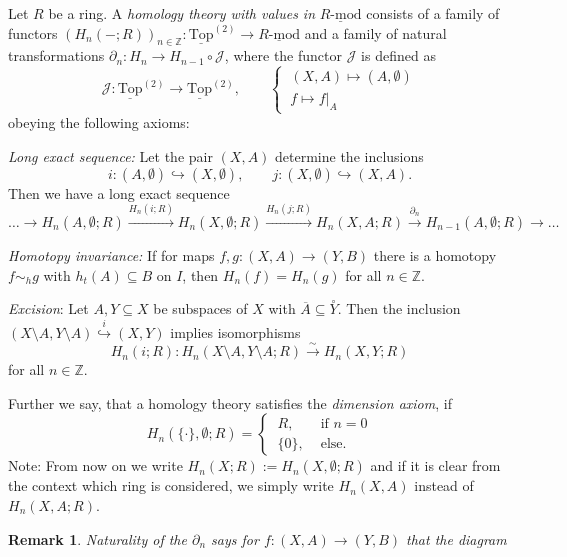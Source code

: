 \documentclass[11pt]{book}
\numberwithin{dummy}{section}
\newtheorem{remark}[theorem]{Remark}
\theoremstyle{nonumberbreak}
\newenvironment{defin}[1][]{\ifthenelse{\equal{#1}{}}{\definition}{\definition[#1]}\rm}{\enddefinition}
\newcommand{\Rmod}{\underline{R\textrm{-}\mathrm{mod}}}
\newcommand{\toptwo}{\underline{\mathrm{Top}}^{(2)}}
\newcommand{\la}{\longrightarrow}
\newcommand{\Z}{\mathbb{Z}}
\begin{document}
\begin{spacing}{1.4}
\begin{defin}
Let $R$ be a ring. A \textit{homology theory with values in} $\Rmod$ consists of a family of functors $(H_n(-;R))_{n \in \mathbb{Z}}: \toptwo \la \Rmod$ and a family of natural transformations $\partial_n: H_n \la H_{n-1} \circ \mathcal{J}$, where the functor $\mathcal{J}$ is defined as
$$\mathcal{J}: \toptwo \la \toptwo, \qquad \begin{cases} \ (X,A) \mapsto (A, \emptyset) \\ \ f \mapsto f\vert_A \end{cases}$$
obeying the following axioms:
\begin{compactenum}
\item \textit{Long exact sequence:} Let the pair $(X,A)$ determine the inclusions
$$i: (A, \emptyset) \hookrightarrow (X, \emptyset), \qquad j: (X, \emptyset) \hookrightarrow (X,A).$$
Then we have a long exact sequence
$$\ldots\rightarrow H_n(A, \emptyset;R) \xrightarrow{H_n(i;R)} H_n(X, \emptyset;R) \xrightarrow{H_n(j;R)} H_n(X,A;R) \xrightarrow{\partial_n} H_{n-1}(A, \emptyset;R) \rightarrow \ldots$$

\item \textit{Homotopy invariance:} If for maps $f,g: (X,A) \la (Y,B)$ there is a homotopy $f \sim_h g$ with $h_t(A) \subseteq B$ on $I$, then $H_n(f) = H_n(g)$ for all $n \in \Z$.

\item \textit{Excision}: Let $A,Y \subseteq X$ be subspaces of $X$ with $\overline{A} \subseteq \overset{\circ}{Y}$. Then the inclusion $\left( X\setminus A, Y \setminus A\right) \overset{i}{\hookrightarrow} (X,Y)$ implies isomorphisms
$$H_n(i;R): H_n(X\setminus A, Y \setminus A;R) \overset{\sim}{\la} H_n(X,Y;R)$$
for all $n \in \mathbb{Z}$.
\end{compactenum}
Further we say, that a homology theory satisfies the \textit{dimension axiom}, if
$$H_n\left(\{ \cdot \}, \emptyset;R\right) = \begin{cases} \ R, & \textrm{ if }n =0\\ \ \{0\}, & \textrm{ else. } \end{cases}$$
Note: From now on we write $H_n(X;R) := H_n(X, \emptyset;R)$ and if it is clear from the context which ring is considered, we simply write $H_n(X,A)$ instead of $H_n(X,A;R)$.
\end{defin}

\begin{remark}
Naturality of the $\partial_n$ says for $f: (X,A) \la (Y,B)$ that the diagram


\end{remark}
\end{spacing}
\end{document}
